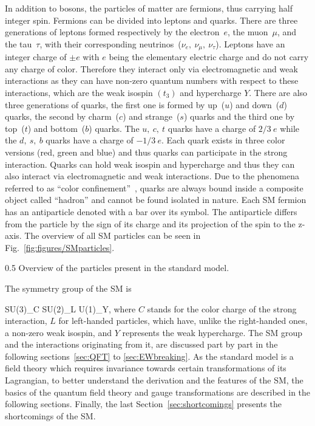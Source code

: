In addition  to bosons, the particles of matter are fermions, thus carrying half integer spin. Fermions can be divided into leptons and quarks. There are three generations of leptons formed respectively by the electron~$e$, the muon~$\mu$, and the tau~$\tau$, with their corresponding neutrinos~($\nu_{e},~\nu_{\mu},~\nu_{\tau}$). Leptons have an integer charge of $\pm e$ with $e$ being the elementary electric charge and do not carry any charge of color. Therefore they interact only via electromagnetic and weak interactions as they can have non-zero quantum numbers with respect to these interactions, which are the weak isospin $(t_{3})$ and hypercharge $Y$. There are also three generations of quarks, the first one is formed by up~($u$) and down~($d$) quarks, the second by charm~($c$) and strange~($s$) quarks and the third one by top~($t$) and bottom~($b$) quarks. The $u,~c,~t$ quarks have a charge of $2/3~e$ while the $d,~s,~b$ quarks have a charge of $-1/3~e$. Each quark exists in three color versions (red, green and blue) and thus quarks can participate in the strong interaction. Quarks can hold weak isospin and hypercharge and thus they can also interact via electromagnetic and weak interactions. Due to the phenomena referred to as ``color confinement''~\cite{Alkofer:2006fu}, quarks are always bound inside a composite object called ``hadron'' and cannot be found isolated in nature. Each SM fermion has an antiparticle denoted with a bar over its symbol. The antiparticle differs from the particle by the sign of its charge and its projection of the spin to the z-axis. The overview of all SM particles can be seen in Fig.~\ref{fig:figures/SMparticles}.



                 {0.5}       %
                 { Overview of the particles present in the standard model.}

The symmetry group of the SM is

{
SU(3)_{C} \otimes SU(2)_{L} \otimes U(1)_{Y},
}
where $C$ stands for the color charge of the strong interaction, $L$ for left-handed particles, which have, unlike the right-handed ones, a non-zero weak isospin, and $Y$ represents the weak hypercharge. The SM group and the interactions originating from it, are discussed part by part in the following sections~\ref{sec:QFT} to \ref{sec:EWbreaking}. As the standard model is a field theory which requires invariance towards certain transformations of its Lagrangian, to better understand the derivation and the features of the SM, the basics of the quantum field theory and gauge transformations are described in the following sections. Finally, the last Section~\ref{sec:shortcomings} presents the shortcomings of the SM.





